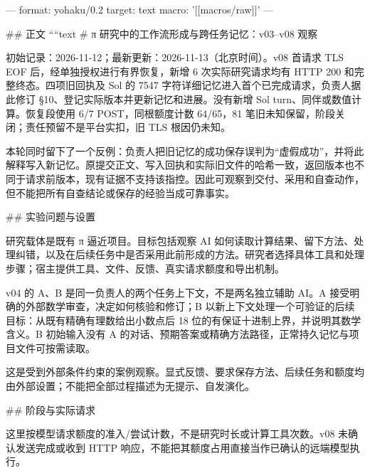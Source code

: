 ---
format: yohaku/0.2
target: text
macro: '[[macros/raw]]'
---

## 正文
````text
# π 研究中的工作流形成与跨任务记忆：v03–v08 观察

初始记录：2026-11-12；最新更新：2026-11-13（北京时间）。v08 首请求 TLS EOF 后，经单独授权进行有界恢复，新增 6 次实际研究请求均有 HTTP 200 和完整终态。四项旧回执及 Sol 的 7547 字符详细记忆进入首个已完成请求，负责人据此修订 §10、登记实际版本并更新记忆和进展。没有新增 Sol turn、同伴或数值计算。恢复段使用 6/7 POST，同根额度计数 64/65，81 笔旧未知保留，阶段关闭；责任预留不是平台实扣，旧 TLS 根因仍未知。

本轮同时留下了一个反例：负责人把旧记忆的成功保存误判为“虚假成功”，并将此解释写入新记忆。原提交正文、写入回执和实际旧文件的哈希一致，返回版本也不同于请求前版本，现有证据不支持该指控。因此可观察到交付、采用和自查动作，但不能把所有自查结论或保存的经验当成可靠事实。

## 实验问题与设置

研究载体是既有 π 逼近项目。目标包括观察 AI 如何读取计算结果、留下方法、处理纠错，以及在后续任务中是否采用此前形成的方法。研究者选择具体工具和处理步骤；宿主提供工具、文件、反馈、真实请求额度和导出机制。

v04 的 A、B 是同一负责人的两个任务上下文，不是两名独立辅助 AI。A 接受明确的外部数学审查，决定如何核验和修订；B 以新上下文处理一个可验证的后续目标：从既有精确有理数给出小数点后 18 位的有保证十进制上界，并说明其数学含义。B 初始输入没有 A 的对话、预期答案或精确方法路径，正常持久记忆与项目文件可按需读取。

这是受到外部条件约束的案例观察。显式反馈、要求保存方法、后续任务和额度均由外部设置；不能把全部过程描述为无提示、自发演化。

## 阶段与实际请求

这里按模型请求额度的准入/尝试计数，不是研究时长或计算工具次数。v08 未确认发送完成或收到 HTTP 响应，不能把其额度占用直接当作已确认的远端模型执行。

